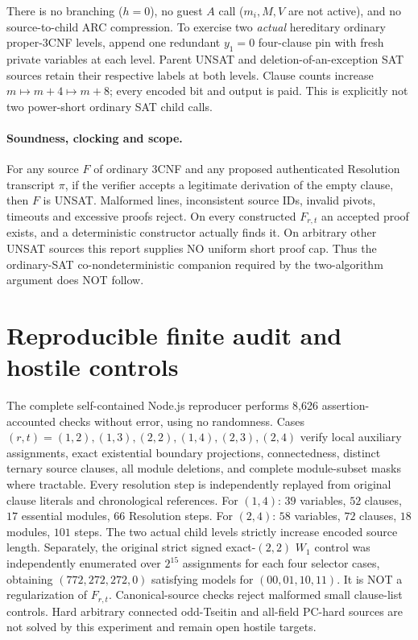 \documentclass[11pt]{article}
\begin{document}
There is no branching ($h=0$), no guest $A$ call
($m_i,M,V$ are not active), and no source-to-child
ARC compression. To exercise two \emph{actual}
hereditary ordinary proper-3CNF levels, append
one redundant $y_1=0$ four-clause pin with fresh
private variables at each level. Parent UNSAT
and deletion-of-an-exception SAT sources retain
their respective labels at both levels.
Clause counts increase $m\mapsto m+4\mapsto m+8$;
every encoded bit and output is paid.
This is explicitly not two power-short
ordinary SAT child calls.

\paragraph{Soundness, clocking and scope.}
For any source $F$ of ordinary 3CNF and any proposed
authenticated Resolution transcript $\pi$, if the
verifier accepts a legitimate derivation of the
empty clause, then $F$ is UNSAT. Malformed lines,
inconsistent source IDs, invalid pivots, timeouts
and excessive proofs reject. On every constructed
$F_{r,t}$ an accepted proof exists, and a deterministic
constructor actually finds it. On arbitrary other
UNSAT sources this report supplies NO uniform short
proof cap. Thus the ordinary-SAT co-nondeterministic
companion required by the two-algorithm argument
does NOT follow.

\section{Reproducible finite audit and hostile controls}
The complete self-contained Node.js reproducer
performs 8,626 assertion-accounted checks without error,
using no randomness. Cases
$(r,t)=(1,2),(1,3),(2,2),(1,4),(2,3),(2,4)$
verify local auxiliary assignments, exact existential
boundary projections, connectedness, distinct ternary
source clauses, all module deletions, and complete
module-subset masks where tractable. Every resolution
step is independently replayed from original clause
literals and chronological references.
For $(1,4)$: $39$ variables, $52$ clauses, $17$
essential modules, $66$ Resolution steps.
For $(2,4)$: $58$ variables, $72$ clauses, $18$
modules, $101$ steps.
The two actual child levels strictly increase encoded
source length. Separately, the original strict signed
exact-$(2,2)$ $W_1$ control was independently enumerated
over $2^{15}$ assignments for each four selector cases,
obtaining $(772,272,272,0)$ satisfying models for
$(00,01,10,11)$. It is NOT a regularization of
$F_{r,t}$. Canonical-source checks reject malformed
small clause-list controls. Hard arbitrary connected
odd-Tseitin and all-field PC-hard sources are
not solved by this experiment and remain open
hostile targets.
\end{document}
